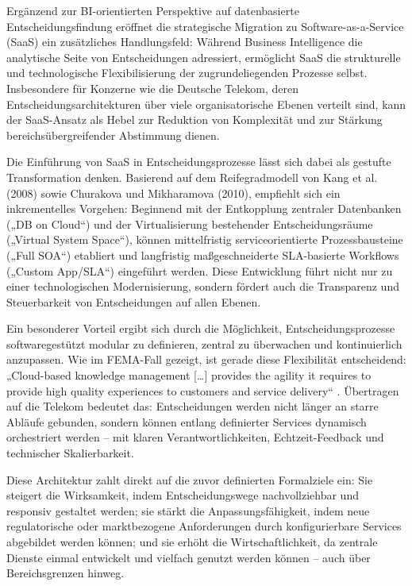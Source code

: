 \documentclass[12pt,a4paper]{article}
\begin{document}
Ergänzend zur BI-orientierten Perspektive auf datenbasierte Entscheidungsfindung eröffnet die strategische Migration zu Software-as-a-Service (SaaS) ein zusätzliches Handlungsfeld: Während Business Intelligence die analytische Seite von Entscheidungen adressiert, ermöglicht SaaS die strukturelle und technologische Flexibilisierung der zugrundeliegenden Prozesse selbst. Insbesondere für Konzerne wie die Deutsche Telekom, deren Entscheidungsarchitekturen über viele organisatorische Ebenen verteilt sind, kann der SaaS-Ansatz als Hebel zur Reduktion von Komplexität und zur Stärkung bereichsübergreifender Abstimmung dienen.

Die Einführung von SaaS in Entscheidungsprozesse lässt sich dabei als gestufte Transformation denken. Basierend auf dem Reifegradmodell von Kang et al. (2008) sowie Churakova und Mikharamova (2010), empfiehlt sich ein inkrementelles Vorgehen: Beginnend mit der Entkopplung zentraler Datenbanken („DB on Cloud“) und der Virtualisierung bestehender Entscheidungsräume („Virtual System Space“), können mittelfristig serviceorientierte Prozessbausteine („Full SOA“) etabliert und langfristig maßgeschneiderte SLA-basierte Workflows („Custom App/SLA“) eingeführt werden. Diese Entwicklung führt nicht nur zu einer technologischen Modernisierung, sondern fördert auch die Transparenz und Steuerbarkeit von Entscheidungen auf allen Ebenen.

Ein besonderer Vorteil ergibt sich durch die Möglichkeit, Entscheidungsprozesse softwaregestützt modular zu definieren, zentral zu überwachen und kontinuierlich anzupassen. Wie im FEMA-Fall gezeigt, ist gerade diese Flexibilität entscheidend: „Cloud-based knowledge management […] provides the agility it requires to provide high quality experiences to customers and service delivery“ \parencite[S.~58]{churakova2020}. Übertragen auf die Telekom bedeutet das: Entscheidungen werden nicht länger an starre Abläufe gebunden, sondern können entlang definierter Services dynamisch orchestriert werden – mit klaren Verantwortlichkeiten, Echtzeit-Feedback und technischer Skalierbarkeit.

Diese Architektur zahlt direkt auf die zuvor definierten Formalziele ein: Sie steigert die Wirksamkeit, indem Entscheidungswege nachvollziehbar und responsiv gestaltet werden; sie stärkt die Anpassungsfähigkeit, indem neue regulatorische oder marktbezogene Anforderungen durch konfigurierbare Services abgebildet werden können; und sie erhöht die Wirtschaftlichkeit, da zentrale Dienste einmal entwickelt und vielfach genutzt werden können – auch über Bereichsgrenzen hinweg.
\end{document}
